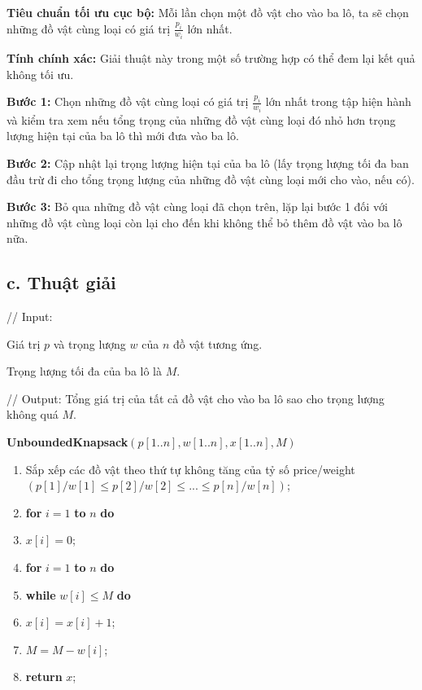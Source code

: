 \documentclass[12pt, a4paper, fleqn]{article}
\begin{document}
	\textbf{Tiêu chuẩn tối ưu cục bộ:} Mỗi lần chọn một đồ vật cho vào ba lô, ta sẽ chọn những đồ vật cùng loại có giá trị $\displaystyle \frac{p_i}{w_i}$ lớn nhất.

	\textbf{Tính chính xác:} Giải thuật này trong một số trường hợp có thể đem lại kết quả không tối ưu.

	\textbf{Bước 1:} Chọn những đồ vật cùng loại có giá trị $\displaystyle \frac{p_i}{w_i}$ lớn nhất trong tập hiện hành và kiểm tra xem nếu tổng trọng của những đồ vật cùng loại đó nhỏ hơn trọng lượng hiện tại của ba lô thì mới đưa vào ba lô.

	\textbf{Bước 2:} Cập nhật lại trọng lượng hiện tại của ba lô (lấy trọng lượng tối đa ban đầu trừ đi cho tổng trọng lượng của những đồ vật cùng loại mới cho vào, nếu có).

	\textbf{Bước 3:} Bỏ qua những đồ vật cùng loại đã chọn trên, lặp lại bước 1 đối với những đồ vật cùng loại còn lại cho đến khi không thể bỏ thêm đồ vật vào ba lô nữa.
	
	\subsection*{c. Thuật giải}
	
	// Input:
	
	Giá trị $p$ và trọng lượng $w$ của $n$ đồ vật tương ứng.
	
	Trọng lượng tối đa của ba lô là $M$.
	
	// Output: Tổng giá trị của tất cả đồ vật cho vào ba lô sao cho trọng lượng không quá $M$.
	
	\textbf{UnboundedKnapsack}$(p[1..n], w[1..n], x[1..n], M)$
	\begin{enumerate}
		\item Sắp xếp các đồ vật theo thứ tự không tăng của tỷ số price/weight $(p[1] / w[1] \leq p[2] / w[2] \leq ... \leq p[n] / w[n])$;
		\item \textbf{for} $i = 1$ \textbf{to} $n$ \textbf{do}
		\item \qquad $x[i] = 0$;
		\item \textbf{for} $i = 1$ \textbf{to} $n$ \textbf{do}
		\item \qquad \textbf{while} $w[i] \leq M$ \textbf{do}
		\item \qquad \qquad $x[i] = x[i] + 1$;
		\item \qquad \qquad $M = M - w[i]$;
		\item \textbf{return} $x$;
	\end{enumerate}
	
\end{document}
